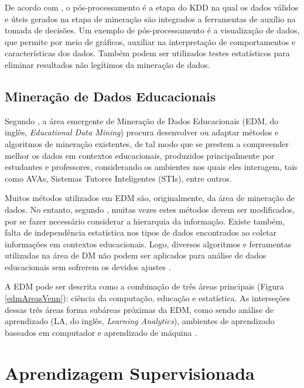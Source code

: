 De acordo com , o pós-processamento é a etapa do
KDD na qual os dados válidos e úteis gerados na etapa de mineração são
integrados a ferramentas de auxílio na tomada de decisões. Um exemplo de
pós-processamento é a visualização de dados, que permite por meio de gráficos,
auxiliar na interpretação de comportamentos e características dos dados. Também
podem ser utilizados testes estatísticos para eliminar resultados não legítimos
da mineração de dados.

\subsection{Mineração de Dados Educacionais}

Segundo , a área emergente de Mineração de Dados
Educacionais (EDM, do inglês, \textit{Educational Data Mining}) procura
desenvolver ou adaptar métodos e algoritmos de mineração existentes, de tal modo
que se prestem a compreender melhor os dados em contextos educacionais,
produzidos principalmente por estudantes e professores, considerando os
ambientes nos quais eles interagem, tais como AVAs, Sistemas Tutores
Inteligentes (STIs), entre outros.

Muitos métodos utilizados em EDM são, originalmente, da área de mineração de
dados. No entanto, segundo , muitas vezes estes
métodos devem ser modificados, por se fazer necessário considerar a hierarquia
da informação. Existe também, falta de independência estatística nos tipos de
dados encontrados ao coletar informações em contextos educacionais. Logo,
diversos algoritmos e ferramentas utilizadas na área de DM não podem ser
aplicados para análise de dados educacionais sem sofrerem os devidos ajustes
\cite{baker2011mineraccao,costa2012mineraccao}.

A EDM pode ser descrita como a combinação de três áreas principais (Figura
\ref{edmAreasVenn}): ciência da computação, educação e estatística. As
interseções dessas três áreas forma subáreas próximas da EDM, como sendo análise
de aprendizado (LA, do inglês, \textit{Learning Analytics}), ambientes de
aprendizado baseados em computador e aprendizado de máquina
\cite{romero2013data}.


\section{Aprendizagem Supervisionada}

